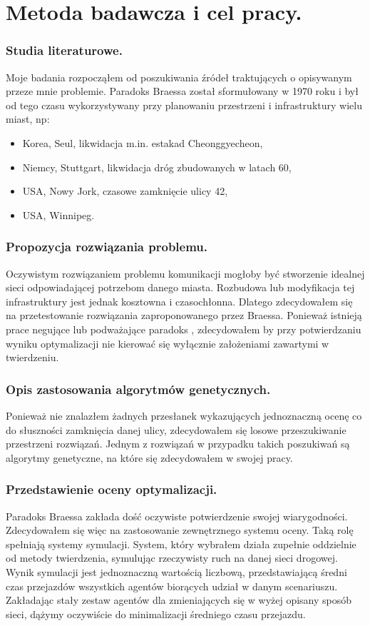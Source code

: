 \documentclass[twoside,12pt]{report}
\begin{document}
\section{Metoda badawcza i cel pracy.}
\subsubsection{Studia literaturowe.}
Moje badania rozpocząłem od poszukiwania źródeł traktujących o opisywanym przeze mnie problemie. Paradoks Braessa został sformułowany w 1970 roku i był od tego czasu wykorzystywany przy planowaniu przestrzeni i infrastruktury wielu miast, np:

\begin{itemize}
\item Korea, Seul, likwidacja m.in. estakad Cheonggyecheon,
\item Niemcy, Stuttgart, likwidacja dróg zbudowanych w latach 60,
\item USA, Nowy Jork, czasowe zamknięcie ulicy 42,
\item USA, Winnipeg.\cite{urban}
\end{itemize}  

\subsubsection{Propozycja rozwiązania problemu.}
Oczywistym rozwiązaniem problemu komunikacji mogłoby być stworzenie idealnej sieci odpowiadającej potrzebom danego miasta. Rozbudowa lub modyfikacja tej infrastruktury jest jednak kosztowna i czasochłonna. Dlatego zdecydowałem się na przetestowanie rozwiązania zaproponowanego przez Braessa. Ponieważ istnieją prace negujące lub podważające paradoks\cite{newinsights} , zdecydowałem by przy potwierdzaniu wyniku optymalizacji nie kierować się wyłącznie założeniami zawartymi w twierdzeniu.

\subsubsection{Opis zastosowania algorytmów genetycznych.}
Ponieważ nie znalazłem żadnych przesłanek wykazujących jednoznaczną ocenę co do słuszności zamknięcia danej ulicy, zdecydowałem się losowe przeszukiwanie przestrzeni rozwiązań. Jednym z rozwiązań w przypadku takich poszukiwań są algorytmy genetyczne, na które się zdecydowałem w swojej pracy.

\subsubsection{Przedstawienie oceny optymalizacji.}
Paradoks Braessa zakłada dość oczywiste potwierdzenie swojej wiarygodności. Zdecydowałem się więc na zastosowanie zewnętrznego systemu oceny. Taką rolę spełniają systemy symulacji. System, który wybrałem działa zupełnie oddzielnie od metody twierdzenia, symulując rzeczywisty ruch na danej sieci drogowej. Wynik symulacji jest jednoznaczną wartością liczbową, przedstawiającą średni czas przejazdów wszystkich agentów biorących udział w danym scenariuszu. Zakładając stały zestaw agentów dla zmieniających się w wyżej opisany sposób sieci, dążymy oczywiście do minimalizacji średniego czasu przejazdu.
\end{document}
